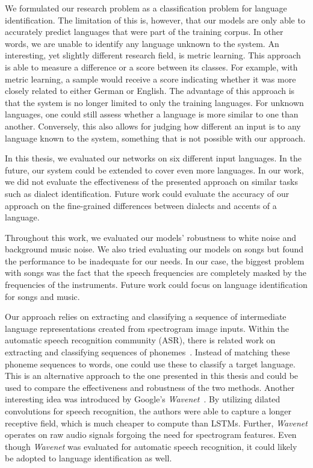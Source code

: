 We formulated our research problem as a classification problem for language identification. The limitation of this is, however, that our models are only able to accurately predict languages that were part of the training corpus. In other words, we are unable to identify any language unknown to the system. An interesting, yet slightly different research field, is metric learning. This approach is able to measure a difference or a score between its classes. For example, with metric learning, a sample would receive a score indicating whether it was more closely related to either German or English. The advantage of this approach is that the system is no longer limited to only the training languages. For unknown languages, one could still assess whether a language is more similar to one than another. Conversely, this also allows for judging how different an input is to any language known to the system, something that is not possible with our approach.

In this thesis, we evaluated our networks on six different input languages. In the future, our system could be extended to cover even more languages. In our work, we did not evaluate the effectiveness of the presented approach on similar tasks such as dialect identification. Future work could evaluate the accuracy of our approach on the fine-grained differences between dialects and accents of a language.

Throughout this work, we evaluated our models' robustness to white noise and background music noise. We also tried evaluating our models on songs but found the performance to be inadequate for our needs. In our case, the biggest problem with songs was the fact that the speech frequencies are completely masked by the frequencies of the instruments. Future work could focus on language identification for songs and music.

Our approach relies on extracting and classifying a sequence of intermediate language representations created from spectrogram image inputs. Within the automatic speech recognition community (ASR), there is related work on extracting and classifying sequences of phonemes~\cite{song2015end}. Instead of matching these phoneme sequences to words, one could use these to classify a target language. This is an alternative approach to the one presented in this thesis and could be used to compare the effectiveness and robustness of the two methods. Another interesting idea was introduced by Google's \emph{Wavenet}~\cite{van2016wavenet}. By utilizing dilated convolutions for speech recognition, the authors were able to capture a longer receptive field, which is much cheaper to compute than LSTMs. Further, \emph{Wavenet} operates on raw audio signals forgoing the need for spectrogram features.  Even though \emph{Wavenet} was evaluated for automatic speech recognition, it could likely be adopted to language identification as well. 

